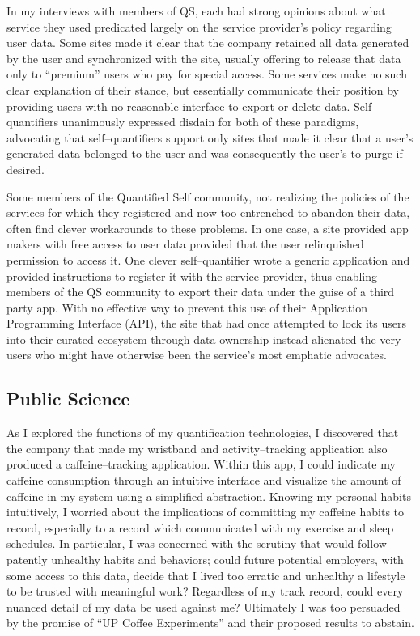 \documentclass{article}
\begin{document}
In my interviews with members of QS,
each had strong opinions about what service they used predicated largely on the service provider's policy regarding user data.
Some sites made it clear that the company retained all data generated by the user and synchronized with the site,
usually offering to release that data only to ``premium'' users who pay for special access.
Some services make no such clear explanation of their stance,
but essentially communicate their position by providing users with no reasonable interface to export or delete data.
Self--quantifiers unanimously expressed disdain for both of these paradigms,
advocating that self--quantifiers support only sites that made it clear that a user's generated data belonged to the user and was consequently the user's to purge if desired.

Some members of the Quantified Self community,
not realizing the policies of the services for which they registered and now too entrenched to abandon their data,
often find clever workarounds to these problems.
In one case,
a site provided app makers with free access to user data provided that the user relinquished permission to access it.
One clever self--quantifier wrote a generic application and provided instructions to register it with the service provider,
thus enabling members of the QS community to export their data under the guise of a third party app.
With no effective way to prevent this use of their Application Programming Interface (API), 
the site that had once attempted to lock its users into their curated ecosystem through data ownership instead alienated the very users who might have otherwise been the service's most emphatic advocates.

\subsection*{Public Science}
As I explored the functions of my quantification technologies,
I discovered that the company that made my wristband and activity--tracking application also produced a caffeine--tracking application.
Within this app,
I could indicate my caffeine consumption through an intuitive interface and visualize the amount of caffeine in my system using a simplified abstraction.
Knowing my personal habits intuitively,
I worried about the implications of committing my caffeine habits to record,
especially to a record which communicated with my exercise and sleep schedules.
In particular,
I was concerned with the scrutiny that would follow patently unhealthy habits and behaviors;
could future potential employers,
with some access to this data,
decide that I lived too erratic and unhealthy a lifestyle to be trusted with meaningful work? Regardless of my track record,
could every nuanced detail of my data be used against me? Ultimately I was too persuaded by the promise of ``UP Coffee Experiments'' and their proposed results to abstain.
\end{document}
